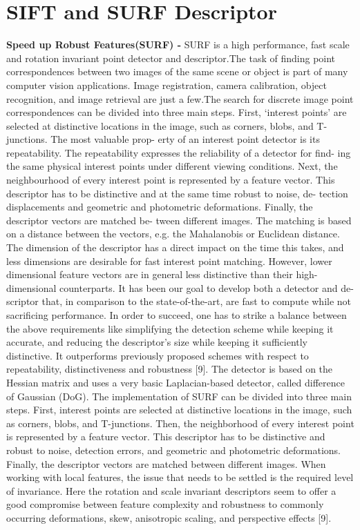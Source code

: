 \section{SIFT and SURF Descriptor}
\label{sec:build2}

\textbf{Speed up Robust Features(SURF) - } SURF is a high performance, fast scale and rotation invariant point detector and descriptor.The task of finding point correspondences between two images of the same scene or object is part of many computer vision applications. Image registration, camera calibration, object recognition, and image retrieval are just a few.The search for discrete image point correspondences can be divided into three main steps. First, ‘interest points’ are selected at distinctive locations in the image, such as corners, blobs, and T-junctions. The most valuable prop- erty of an interest point detector is its repeatability. The repeatability expresses the reliability of a detector for find- ing the same physical interest points under different viewing conditions. Next, the neighbourhood of every interest point is represented by a feature vector. This descriptor has to be distinctive and at the same time robust to noise, de- tection displacements and geometric and photometric deformations. Finally, the descriptor vectors are matched be- tween different images. The matching is based on a distance between the vectors, e.g. the Mahalanobis or Euclidean distance. The dimension of the descriptor has a direct impact on the time this takes, and less dimensions are desirable for fast interest point matching. However, lower dimensional feature vectors are in general less distinctive than their high-dimensional counterparts.
It has been our goal to develop both a detector and de- scriptor that, in comparison to the state-of-the-art, are fast to compute while not sacrificing performance. In order to succeed, one has to strike a balance between the above requirements like simplifying the detection scheme while keeping it accurate, and reducing the descriptor’s size while keeping it sufficiently distinctive.
 It outperforms previously proposed schemes with respect to repeatability, distinctiveness and robustness [9]. The detector is based on the Hessian matrix and uses a very basic Laplacian-based detector, called difference of Gaussian (DoG). The implementation of SURF can be divided into three main steps. First, interest points are selected at distinctive locations in the image, such as corners, blobs, and T-junctions. Then, the neighborhood of every interest point is represented by a feature vector. This descriptor has to be distinctive and robust to noise, detection errors, and geometric and photometric deformations. Finally, the descriptor vectors are matched between different images. When working with local features, the issue that needs to be settled is the required level of invariance. Here the rotation and scale invariant descriptors seem to offer a good compromise between feature complexity and robustness to commonly occurring deformations, skew, anisotropic scaling, and perspective effects [9].

